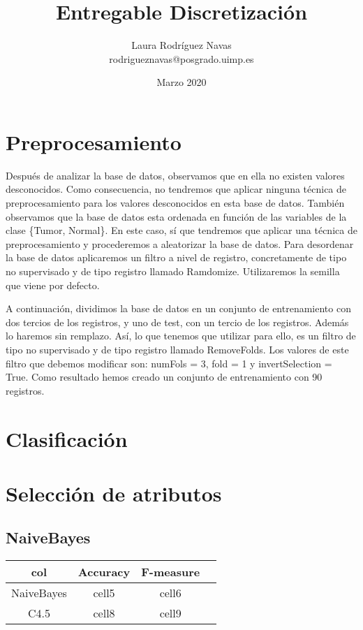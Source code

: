 \documentclass{article}
\title{Entregable Discretización}
\author{Laura Rodríguez Navas \\ rodrigueznavas@posgrado.uimp.es}
\date{Marzo 2020}
\begin{document}
\maketitle

\section*{Preprocesamiento}

Después de analizar la base de datos, observamos que en ella no existen valores desconocidos. Como consecuencia, no tendremos que aplicar ninguna técnica de preprocesamiento para los valores desconocidos en esta base de datos. También observamos que la base de datos esta ordenada en función de las variables de la clase \{Tumor, Normal\}. En este caso, sí que tendremos que aplicar una técnica de preprocesamiento y procederemos a aleatorizar la base de datos. Para desordenar la base de datos aplicaremos un filtro a nivel de registro, concretamente de tipo no supervisado y de tipo registro llamado Ramdomize. Utilizaremos la semilla que viene por defecto. 

A continuación, dividimos la base de datos en un conjunto de entrenamiento con dos tercios de los registros, y uno de test, con un tercio de los registros. Además lo haremos sin remplazo. Así, lo que tenemos que utilizar para ello, es un filtro de tipo no supervisado y de tipo registro llamado RemoveFolds. Los valores de este filtro que debemos modificar son: numFols = 3, fold = 1 y invertSelection = True. Como resultado hemos creado un conjunto de entrenamiento con 90 registros.

\section*{Clasificación}

\section*{Selección de atributos}

\subsection*{NaiveBayes}

\begin{center}
	\begin{tabular}{ |c|c|c|c| } 
		\hline
		col & Accuracy & F-measure \\
		\hline
		NaiveBayes& cell5 & cell6 \\ 
		C4.5 & cell8 & cell9 \\ 
		\hline
	\end{tabular}
\end{center}
\end{document}
